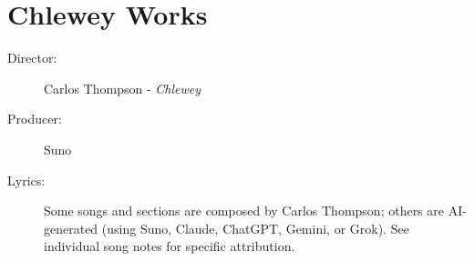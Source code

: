 \chapter{Chlewey Works}

\begin{description}
\item[Director:] Carlos Thompson - \emph{Chlewey}
\item[Producer:] Suno
\item[Lyrics:] Some songs and sections are composed by Carlos Thompson; others are AI-generated (using Suno, Claude, ChatGPT, Gemini, or Grok). %
See individual song notes for specific attribution.
\end{description}

\sepbar






















































